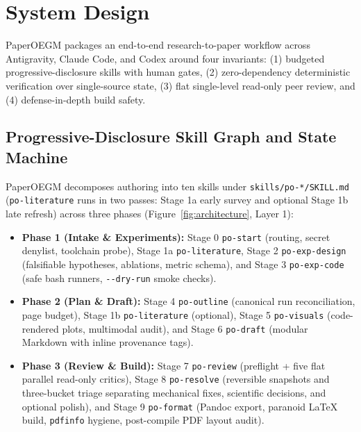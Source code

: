 \section{System Design}\label{sec:method}

PaperOEGM packages an end-to-end research-to-paper workflow across Antigravity, Claude Code, and Codex around four invariants: (1) budgeted progressive-disclosure skills with human gates, (2) zero-dependency deterministic verification over single-source state, (3) flat single-level read-only peer review, and (4) defense-in-depth build safety.

\subsection{Progressive-Disclosure Skill Graph and State Machine}\label{sec:method-skills}

PaperOEGM decomposes authoring into ten skills under \texttt{skills/\allowbreak{}po-*/\allowbreak{}SKILL.\allowbreak{}md} (\texttt{po-literature} runs in two passes: Stage 1a early survey and optional Stage 1b late refresh) across three phases (Figure~\ref{fig:architecture}, Layer 1):

\begin{itemize}
\tightlist
\item
  \textbf{Phase 1 (Intake \& Experiments):} Stage 0 \texttt{po-start} (routing, secret denylist, toolchain probe), Stage 1a \texttt{po-literature}, Stage 2 \texttt{po-exp-design} (falsifiable hypotheses, ablations, metric schema), and Stage 3 \texttt{po-exp-code} (safe bash runners, \texttt{\mbox{-{}-}dry-\allowbreak{}run} smoke checks).
\item
  \textbf{Phase 2 (Plan \& Draft):} Stage 4 \texttt{po-outline} (canonical run reconciliation, page budget), Stage 1b \texttt{po-literature} (optional), Stage 5 \texttt{po-visuals} (code-rendered plots, multimodal audit), and Stage 6 \texttt{po-draft} (modular Markdown with inline provenance tags).
\item
  \textbf{Phase 3 (Review \& Build):} Stage 7 \texttt{po-review} (preflight + five flat parallel read-only critics), Stage 8 \texttt{po-resolve} (reversible snapshots and three-bucket triage separating mechanical fixes, scientific decisions, and optional polish), and Stage 9 \texttt{po-format} (Pandoc export, paranoid LaTeX build, \texttt{pdfinfo} hygiene, post-compile PDF layout audit).
\end{itemize}

